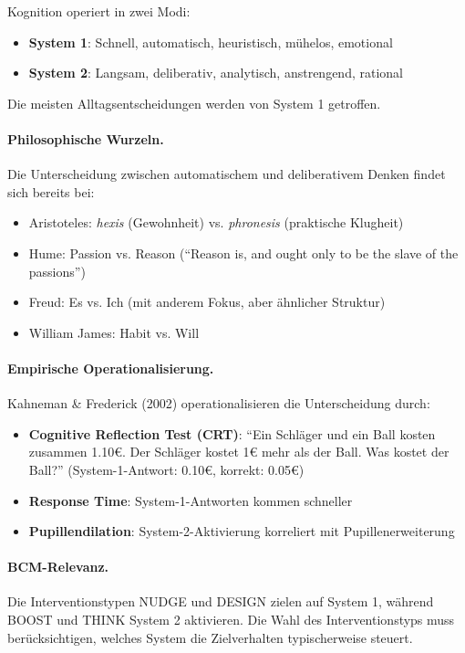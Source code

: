 \begin{axiom}
Kognition operiert in zwei Modi:
\begin{itemize}
    \item \textbf{System 1}: Schnell, automatisch, heuristisch, mühelos, emotional
    \item \textbf{System 2}: Langsam, deliberativ, analytisch, anstrengend, rational
\end{itemize}
Die meisten Alltagsentscheidungen werden von System 1 getroffen.

\paragraph{Philosophische Wurzeln.}
Die Unterscheidung zwischen automatischem und deliberativem Denken findet sich bereits bei:
\begin{itemize}
    \item Aristoteles: \textit{hexis} (Gewohnheit) vs. \textit{phronesis} (praktische Klugheit)
    \item Hume: Passion vs. Reason (``Reason is, and ought only to be the slave of the passions'')
    \item Freud: Es vs. Ich (mit anderem Fokus, aber ähnlicher Struktur)
    \item William James: Habit vs. Will
\end{itemize}

\paragraph{Empirische Operationalisierung.}
Kahneman \& Frederick (2002) operationalisieren die Unterscheidung durch:
\begin{itemize}
    \item \textbf{Cognitive Reflection Test (CRT)}: ``Ein Schläger und ein Ball kosten zusammen 1.10€. Der Schläger kostet 1€ mehr als der Ball. Was kostet der Ball?'' (System-1-Antwort: 0.10€, korrekt: 0.05€)
    \item \textbf{Response Time}: System-1-Antworten kommen schneller
    \item \textbf{Pupillendilation}: System-2-Aktivierung korreliert mit Pupillenerweiterung
\end{itemize}

\paragraph{BCM-Relevanz.}
Die Interventionstypen NUDGE und DESIGN zielen auf System 1, während BOOST und THINK System 2 aktivieren. Die Wahl des Interventionstyps muss berücksichtigen, welches System die Zielverhalten typischerweise steuert.
\end{axiom}

